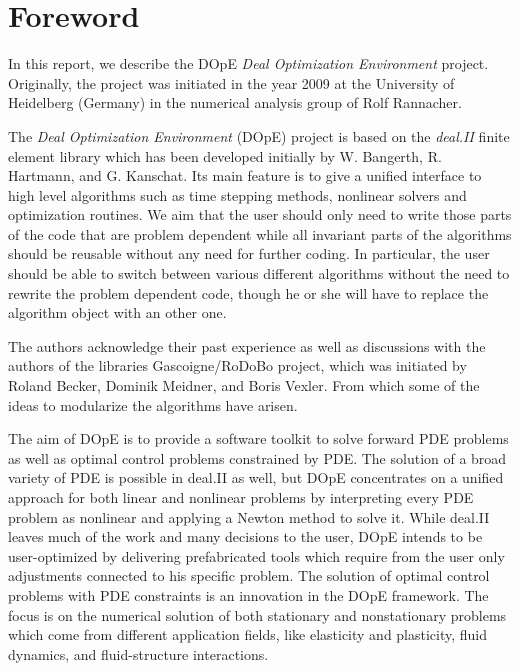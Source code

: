 \chapter{Foreword}
In this report, we describe the DOpE
\textit{Deal Optimization Environment} project. 
Originally, the project was initiated in the year 2009 at the 
University of Heidelberg (Germany) in the numerical analysis
group of Rolf Rannacher. 

The \textit{Deal Optimization Environment} (DOpE) project is 
based on the \textit{deal.II} finite element library which has been developed
 initially by W. Bangerth, R. Hartmann, and G. Kanschat. 
Its main feature is to give a unified interface to high level algorithms such as 
time stepping methods, nonlinear solvers and optimization routines. 
We aim that the user should only need to write those parts
of the code that are problem dependent while all invariant parts of the algorithms
should be reusable without any need for further coding.
In particular, the user should be able to switch between various different 
algorithms without the need to rewrite the problem dependent code, though he or she will
have to replace the algorithm object with an other one. 

The authors acknowledge their past experience as well as discussions with 
the authors of the libraries 
Gascoigne/RoDoBo project, which was initiated by 
Roland Becker, Dominik Meidner,  and Boris Vexler.  
From which some of the ideas to modularize the algorithms have arisen.

The aim of DOpE is to provide a software toolkit to solve forward PDE
problems as well as optimal control problems constrained by PDE. The
solution of a broad variety of PDE is possible in deal.II as well, but
DOpE concentrates on a unified approach for both linear and nonlinear
problems by interpreting every PDE problem as nonlinear and applying a
Newton method to solve it. While deal.II leaves much of the work and many
decisions to the user, DOpE intends to be user-optimized by delivering
prefabricated tools which require from the user only adjustments connected
to his specific problem. The solution of optimal control problems with PDE
constraints is an innovation in the DOpE framework.
The focus is on the numerical solution of both stationary and nonstationary
problems which come from different application fields, like elasticity and
plasticity, fluid dynamics, and fluid-structure interactions.

